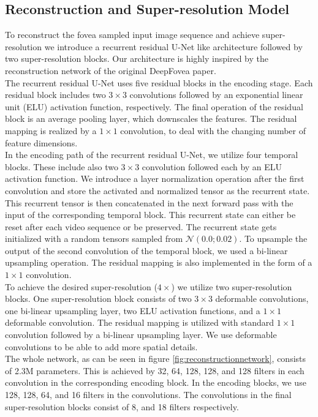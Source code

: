 \documentclass[10pt,twocolumn,letterpaper]{article}
\newcommand{\Gaussian}[1]{\mathcal{N}\left(#1\right)}
\begin{document}
	\subsection{Reconstruction and Super-resolution Model} \label{subsec:reconstructionsuperresmodel}
	To reconstruct the fovea sampled input image sequence and achieve super-resolution we introduce a recurrent residual U-Net like architecture followed by two super-resolution blocks. Our architecture is highly inspired by the reconstruction network of the original DeepFovea paper. \cite{deepfovea}\\
	The recurrent residual U-Net uses five residual blocks in the encoding stage. Each residual block includes two $3\times 3$ convolutions followed by an exponential linear unit (ELU) \cite{elu} activation function, respectively. The final operation of the residual block is an average pooling layer, which downscales the features. The residual mapping is realized by a $1 \times 1$ convolution, to deal with the changing number of feature dimensions.\\
	In the encoding path of the recurrent residual U-Net, we utilize four temporal blocks. These include also two $3\times 3$ convolution followed each by an ELU activation function. We introduce a layer normalization \cite{layernorm} operation after the first convolution and store the activated and normalized tensor as the recurrent state. This recurrent tensor is then concatenated in the next forward pass with the input of the corresponding temporal block. This recurrent state can either be reset after each video sequence or be preserved. The recurrent state gets initialized with a random tensors sampled from $\Gaussian{0.0; 0.02}$. To upsample the output of the second convolution of the temporal block, we used a bi-linear upsampling operation. The residual mapping is also implemented in the form of a $1\times 1$ convolution.\\
	To achieve the desired super-resolution ($4\times$) we utilize two super-resolution blocks. One super-resolution block consists of two $3\times 3$ deformable convolutions, one bi-linear upsampling layer, two ELU activation functions, and a $1\times 1$ deformable convolution. The residual mapping is utilized with standard $1\times 1$ convolution followed by a bi-linear upsampling layer. We use deformable convolutions to be able to add more spatial details.\\
	The whole network, as can be seen in figure \ref{fig:reconstructionnetwork}, consists of 2.3M parameters. This is achieved by 32, 64, 128, 128, and 128 filters in each convolution in the corresponding encoding block. In the encoding blocks, we use 128, 128, 64, and 16 filters in the convolutions. The convolutions in the final super-resolution blocks consist of 8, and 18 filters respectively.
	
\end{document}
